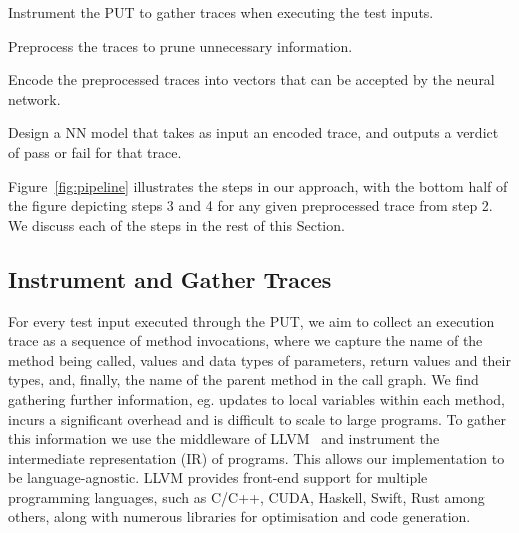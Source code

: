 \begin{description}[itemsep = 0pt, topsep = 0pt, partopsep=0pt]
 \item[Step 1:] Instrument the PUT to gather traces when executing the test inputs.
 \item[Step 2:] Preprocess the traces to prune unnecessary information.
 \item[Step 3:] Encode the preprocessed traces into vectors that can be accepted by the neural network.
 \item[Step 4:] Design a NN model that takes as input an encoded trace, and outputs a verdict of pass or fail for that trace.
\end{description}
Figure~\ref{fig:pipeline} illustrates the steps in our approach, with the bottom half of the figure depicting steps 3 and 4 for any given preprocessed trace from step 2.
We discuss each of the steps in the rest of this Section.

\subsection{Instrument and Gather Traces}
\label{sec:instrument}
For every test input executed through the PUT, we aim to collect an execution trace as a sequence of method invocations, where we capture the name of the method being called, values and data types of parameters, return values and their types, and, finally, the name of the parent method in the call graph. We find gathering further information, eg. updates to local variables within each method, incurs a significant overhead and is difficult to scale to large programs. %
To gather this information we use the middleware of LLVM~\cite{LLVMoriginal} and instrument the intermediate representation (IR) of programs.
This allows our implementation to be language-agnostic. LLVM provides front-end support for multiple programming languages, such as C/C++, CUDA, Haskell, Swift, Rust among others, along with numerous libraries for optimisation and code generation.


